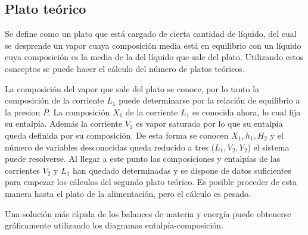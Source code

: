 \documentclass[11pt,openany]{book}
\begin{document}
\subsection{Plato teórico}
Se define como un plato que está cargado de cierta cantidad de líquido, del cual se desprende 
un vapor cuaya composición media está en equilibrio con un líquido cuya composición es la media de 
la del líquido que sale del plato. Utilizando estos conceptos se puede hacer el cálculo del número de 
platos teóricos.

La composición del vapor que sale del plato se conoce, por lo tanto la composición de la corriente 
$L_1$ puede determinarse por la relación de equilibrio a la presion $P$. La composición $X_1$ de la corriente 
$L_1$ es conocida ahora, lo cual fija su entalpía. Además la corriente $V_2$ es vapor saturado por lo que 
su entalpía queda definida por su composición. De esta forma se conocen $X_1, h_1, H_2$ y el número 
de variables desconocidas queda reducido a tres ($L_1,V_2,Y_2$) el sistema puede resolverse. Al llegar a
este punto las composiciones y entalpías de las corrientes $V_2$ y $L_1$ han quedado determinadas y se 
dispone de datos suficientes para empezar los cálculos del segundo plato teórico. Es posible 
proceder de esta manera hasta el plato de la alimentación, pero el cálculo es pesado.

Una solución más rápida de los balances de materia y energía puede obtenerse gráficamente 
utilizando los diagramas entalpía-composición.
\end{document}
